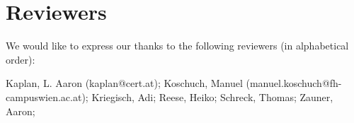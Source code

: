 \section{Reviewers}

We would like to express our thanks to the following reviewers (in alphabetical order):

Kaplan, L. Aaron (kaplan@cert.at); 
Koschuch, Manuel (manuel.koschuch@fh-campuswien.ac.at); 
Kriegisch, Adi; 
Reese, Heiko; 
Schreck, Thomas; 
Zauner, Aaron; 


